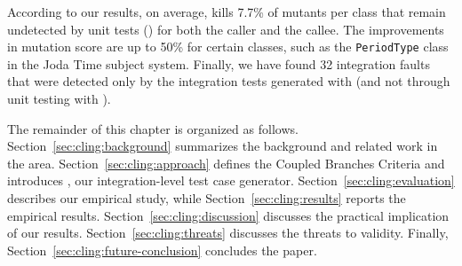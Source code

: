 According to our results, on average, \cling kills 7.7\% of mutants per class that remain undetected by unit tests (\evosuite) for both the caller and the callee. The improvements in mutation score are up to 50\% for certain classes, such as the \texttt{PeriodType} class in the Joda Time subject system.
Finally, we have found 32 integration faults that were detected only by the integration tests generated with \cling (and not through unit testing with \evosuite).


The remainder of this chapter is organized as follows. Section~\ref{sec:cling:background} summarizes the background and related work in the area. %
Section~\ref{sec:cling:approach} defines the Coupled Branches Criteria and introduces \cling, our integration-level test case generator. Section~\ref{sec:cling:evaluation} describes our empirical study, while Section~\ref{sec:cling:results} reports the empirical results. Section~\ref{sec:cling:discussion} discusses the practical implication of our results. Section~\ref{sec:cling:threats} discusses the threats to validity. Finally, Section~\ref{sec:cling:future-conclusion} concludes the paper.




